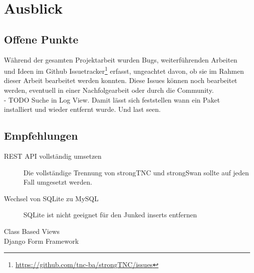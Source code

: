 \chapter{Ausblick}

\section{Offene Punkte}
Während der gesamten Projektarbeit wurden Bugs, weiterführenden Arbeiten und
Ideen im Github
Issuetracker\footnote{\url{https://github.com/tnc-ba/strongTNC/issues}} erfasst,
ungeachtet davon, ob sie im Rahmen dieser Arbeit bearbeitet werden konnten.
Diese Issues können noch bearbeitet werden, eventuell in einer Nachfolgearbeit
oder durch die Community.\\





- TODO Suche in Log View. Damit lässt sich feststellen wann ein Paket installiert und wieder entfernt wurde.
Und last seen.

\section{Empfehlungen}
\begin{description}
	\item[REST API vollständig umsetzen] Die vollständige Trennung von strongTNC
	und strongSwan sollte auf jeden Fall umgesetzt werden.
	
	\item[Wechsel von SQLite zu MySQL] SQLite ist nicht geeignet für den    Junked inserts entfernen
	\item[Class Based Views]
	\item[Django Form Framework]
\end{description}